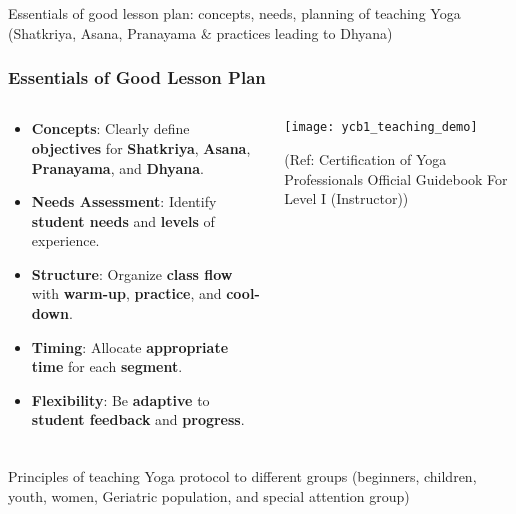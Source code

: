\begin{frame}[fragile]\frametitle{}
\begin{center}
{\Large Essentials  of  good  lesson  plan:  concepts,  needs,  planning  of  teaching  Yoga  (Shatkriya, Asana, Pranayama \& practices leading to Dhyana) }
\end{center}
\end{frame}

\begin{frame}[fragile]\frametitle{Essentials of Good Lesson Plan}
\begin{columns}
    \begin{column}[T]{0.5\linewidth}
      \begin{itemize}
        \item \textbf{Concepts}: Clearly define \textbf{objectives} for \textbf{Shatkriya}, \textbf{Asana}, \textbf{Pranayama}, and \textbf{Dhyana}.
        \item \textbf{Needs Assessment}: Identify \textbf{student needs} and \textbf{levels} of experience.
        \item \textbf{Structure}: Organize \textbf{class flow} with \textbf{warm-up}, \textbf{practice}, and \textbf{cool-down}.
        \item \textbf{Timing}: Allocate \textbf{appropriate time} for each \textbf{segment}.
        \item \textbf{Flexibility}: Be \textbf{adaptive} to \textbf{student feedback} and \textbf{progress}.
      \end{itemize}
    \end{column}
    \begin{column}[T]{0.5\linewidth}
        \begin{center}
        \texttt{[image: ycb1\_teaching\_demo]}
		
		{\tiny (Ref: Certification  of Yoga Professionals Official Guidebook For Level I (Instructor))}		
        \end{center}	
    \end{column}
\end{columns}
\end{frame}


\begin{frame}[fragile]\frametitle{}
\begin{center}
{\Large Principles  of  teaching  Yoga  protocol  to  different  groups  (beginners,  children,  youth, women, Geriatric population, and special attention group)}
\end{center}
\end{frame}

